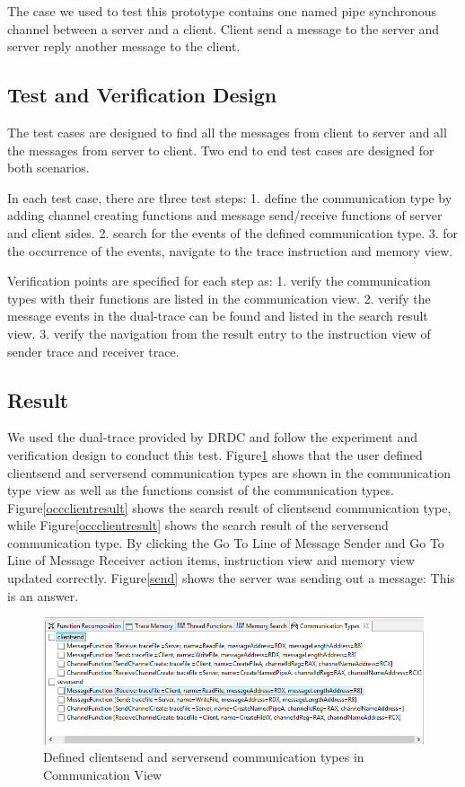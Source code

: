 \label{chapter:Exp}

The case we used to test this prototype contains one named pipe synchronous channel between a server and a client. Client send a message to the server and server reply another message to the client. 
\subsection{Test and Verification Design}
The test cases are designed to find all the messages from client to server and all the messages from server to client. Two end to end test cases are designed for both scenarios. 

In each test case, there are three test steps: 1. define the communication type by adding channel creating functions and message send/receive functions of server and client sides. 2. search for the events of  the defined communication type. 3. for the occurrence of the events, navigate to the trace instruction and memory view.

Verification points are specified for each step as: 1. verify the communication types with their functions are listed in the communication view. 2. verify the message events in the dual-trace can be found and listed in the search result view. 3. verify the navigation from the result entry to the instruction view of sender trace and receiver trace.
\subsection{Result}
We used the dual-trace provided by DRDC and follow the experiment and verification design to conduct this test. Figure\ref{addcomtyperesult} shows that the user defined clientsend and serversend communication types are shown in the communication type view as well as the functions consist of the communication types. Figure\ref{occclientresult} shows the search result of clientsend communication type, while Figure\ref{occclientresult} shows the search result of the serversend communication type. By clicking the Go To Line of Message Sender and Go To Line of Message Receiver action items, instruction view and memory view updated correctly. Figure\ref{send} shows the server was sending out a message: This is an answer. 


\begin{figure}[H]
\includegraphics[scale=.72]{Figures/addcomtyperesult}
 \caption{Defined clientsend and serversend communication types in Communication View}
\label{addcomtyperesult}
\end{figure}

